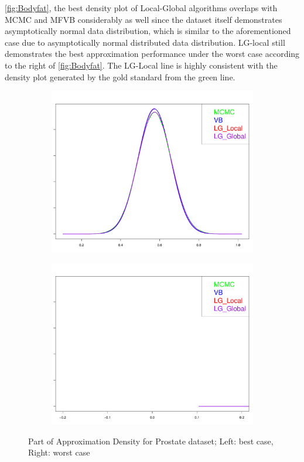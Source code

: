\autoref{fig:Bodyfat}, the best density plot of Local-Global algorithms overlaps with MCMC and MFVB considerably as well since the dataset itself demonstrates asymptotically normal data distribution, which is similar to the aforementioned case due to asymptotically normal distributed data distribution. LG-local still demonstrates the best approximation performance under the worst case according to the right of \autoref{fig:Bodyfat}. The LG-Local line is highly consistent with the density plot generated by the gold standard from the green line.\\
\begin{figure}[h]
	\begin{subfigure}{0.5\textwidth}
		\centering
		\includegraphics[page = 1, width=\linewidth,keepaspectratio]{lasso_densities_prostate.pdf}
	\end{subfigure}
	\begin{subfigure}{0.5\textwidth}
		\includegraphics[page = 7, width=\linewidth,keepaspectratio]{lasso_densities_prostate-1.pdf}
	\end{subfigure}
	\caption{Part of Approximation Density for Prostate dataset; Left: best case, Right: worst case}
	\label{fig:Prostate}
\end{figure}
